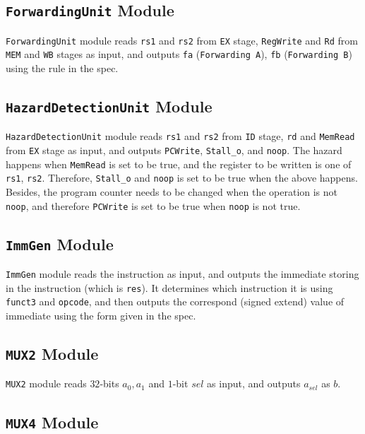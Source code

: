 \subsection{\texttt{ForwardingUnit} Module}

\texttt{ForwardingUnit} module reads \texttt{rs1} and \texttt{rs2} from \texttt{EX} stage, \texttt{RegWrite} and \texttt{Rd} from \texttt{MEM} and \texttt{WB} stages as input, and outputs \texttt{fa} (\texttt{Forwarding A}), \texttt{fb} (\texttt{Forwarding B}) using the rule in the spec.

\subsection{\texttt{HazardDetectionUnit} Module}

\texttt{HazardDetectionUnit} module reads \texttt{rs1} and \texttt{rs2} from \texttt{ID} stage, \texttt{rd} and \texttt{MemRead} from \texttt{EX} stage as input, and outputs \texttt{PCWrite}, \texttt{Stall\_o}, and \texttt{noop}. The hazard happens when \texttt{MemRead} is set to be true, and the register to be written is one of \texttt{rs1}, \texttt{rs2}. Therefore, \texttt{Stall\_o} and \texttt{noop} is set to be true when the above happens. Besides, the program counter needs to be changed when the operation is not \texttt{noop}, and therefore \texttt{PCWrite} is set to be true when \texttt{noop} is not true.

\subsection{\texttt{ImmGen} Module}

\texttt{ImmGen} module reads the instruction as input, and outputs the immediate storing in the instruction (which is \texttt{res}). It determines which instruction it is using \texttt{funct3} and \texttt{opcode}, and then outputs the correspond (signed extend) value of immediate using the form given in the spec.

\subsection{\texttt{MUX2} Module}

\texttt{MUX2} module reads $32$-bits $a_0, a_1$ and $1$-bit $sel$ as input, and outputs $a_{sel}$ as $b$.

\subsection{\texttt{MUX4} Module}

